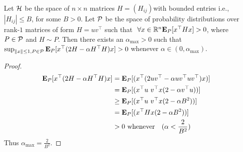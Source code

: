 \begin{theorem}
Let $\H$ be the space of $n\times n$ matrices $H=(H_{ij})$with bounded entries i.e., $|H_{ij}|\leq B$, for some $B>0$. Let $\P$ be the space of probability distributions over rank-$1$ matrices of form $H=uv^\top$ such that $~\forall x\in \R^n \E_{P}[x^\top H x]>0$, where $P\in \P$ and $H\sim P$. Then there exists an $\alpha_{\max}>0$ such that 
$\sup_{\norm{x}\leq 1,P\in \P}\E_{P}[x^\top (2H - \alpha H^\top H)x ]>0$ whenever $\alpha\in (0,\alpha_{\max})$.
\end{theorem}

\begin{proof}
\begin{align}
\begin{split}
\E_{P}[x^\top (2H - \alpha H^\top H)x ]&=\E_{P}[( x^\top( 2uv^\top -\alpha uv^\top u v^\top) x ) ]\\
&=\E_{P}[( x^\top u \,\, v^\top x (2-\alpha v^\top u)) ]\\
&\geq\E_{P}[( x^\top u\,\, v^\top x (2-\alpha B^2)) ]\\
&=\E_{P}[( x^\top H x (2-\alpha B^2)) ]\\
&>0 \text{~whenever}\quad (\alpha<\frac{2}{B^2})
\end{split}
\end{align}
Thus $\alpha_{\max}=\frac{2}{B^2}$.
\end{proof}

